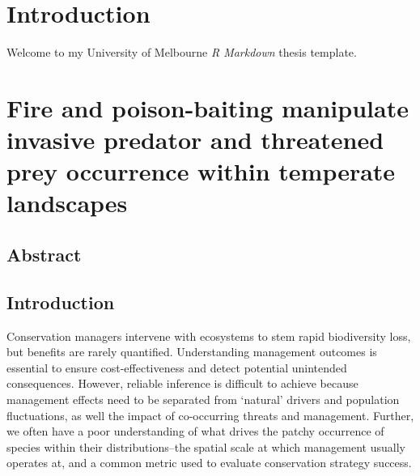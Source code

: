 \documentclass[11pt,a4paper,titlepage,twoside,openright]{style/unimelbthesis}
\begin{document}
%

\begin{mainmatter}

\hypertarget{introduction}{%
\chapter*{Introduction}\label{introduction}}

Welcome to my University of Melbourne \emph{R Markdown} thesis template.

\hypertarget{occ}{%
\chapter{Fire and poison-baiting manipulate invasive predator and threatened prey occurrence within temperate landscapes}\label{occ}}

\hypertarget{abstract}{%
\section*{Abstract}\label{abstract}}

\newpage

\hypertarget{introduction-1}{%
\section{Introduction}\label{introduction-1}}

Conservation managers intervene with ecosystems to stem rapid biodiversity loss, but benefits are rarely quantified. Understanding management outcomes is essential to ensure cost-effectiveness and detect potential unintended consequences. However, reliable inference is difficult to achieve because management effects need to be separated from `natural' drivers and population fluctuations, as well the impact of co-occurring threats and management. Further, we often have a poor understanding of what drives the patchy occurrence of species within their distributions--the spatial scale at which management usually operates at, and a common metric used to evaluate conservation strategy success.


\end{mainmatter}
\end{document}
